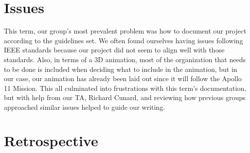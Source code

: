 \documentclass[onecolumn, draftclsnofoot,10pt, compsoc]{IEEEtran}
\begin{document}
\section{Issues}
This term, our group's most prevalent problem was how to document our project according to the guidelines set. We often found ourselves having issues following IEEE standards because our project did not seem to align well with those standards. Also, in terms of a 3D animation, most of the organization that needs to be done is included when deciding what to include in the animation, but in our case, our animation has already been laid out since it will follow the Apollo 11 Mission. This all culminated into frustrations with this term's documentation, but with help from our TA, Richard Cunard, and reviewing how previous groups approached similar issues helped to guide our writing. 

\section{Retrospective}
\end{document}
